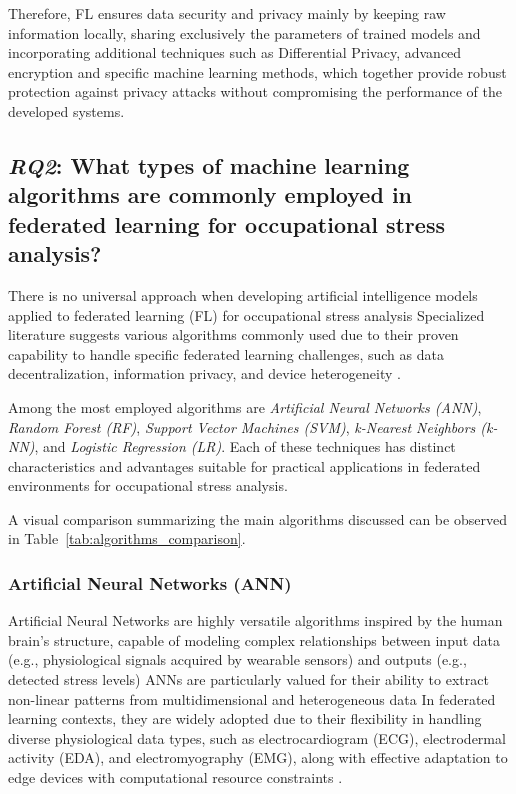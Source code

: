 \documentclass[12pt]{article}
\begin{document}
Therefore, FL ensures data security and privacy mainly by keeping raw information locally, sharing exclusively the parameters of trained models and incorporating additional techniques such as Differential Privacy, advanced encryption and specific machine learning methods, which together provide robust protection against privacy attacks without compromising the performance of the developed systems.
    
\subsection{\textit{RQ2}: What types of machine learning algorithms are commonly employed in federated learning for occupational stress analysis?}

There is no universal approach when developing artificial intelligence models applied to federated learning (FL) for occupational stress analysis Specialized literature suggests various algorithms commonly used due to their proven capability to handle specific federated learning challenges, such as data decentralization, information privacy, and device heterogeneity \cite{adam_sadilek_c59c73f4}.

Among the most employed algorithms are \textit{Artificial Neural Networks (ANN)}, \textit{Random Forest (RF)}, \textit{Support Vector Machines (SVM)}, \textit{k-Nearest Neighbors (k-NN)}, and \textit{Logistic Regression (LR)}. Each of these techniques has distinct characteristics and advantages suitable for practical applications in federated environments for occupational stress analysis.

A visual comparison summarizing the main algorithms discussed can be observed in Table~\ref{tab:algorithms_comparison}.

\subsubsection{Artificial Neural Networks (ANN)}

Artificial Neural Networks are highly versatile algorithms inspired by the human brain's structure, capable of modeling complex relationships between input data (e.g., physiological signals acquired by wearable sensors) and outputs (e.g., detected stress levels) ANNs are particularly valued for their ability to extract non-linear patterns from multidimensional and heterogeneous data \cite{abdulrahman_alahmadi_32bc288c} In federated learning contexts, they are widely adopted due to their flexibility in handling diverse physiological data types, such as electrocardiogram (ECG), electrodermal activity (EDA), and electromyography (EMG), along with effective adaptation to edge devices with computational resource constraints \cite{abdulrahman_alahmadi_32bc288c}.
\end{document}
